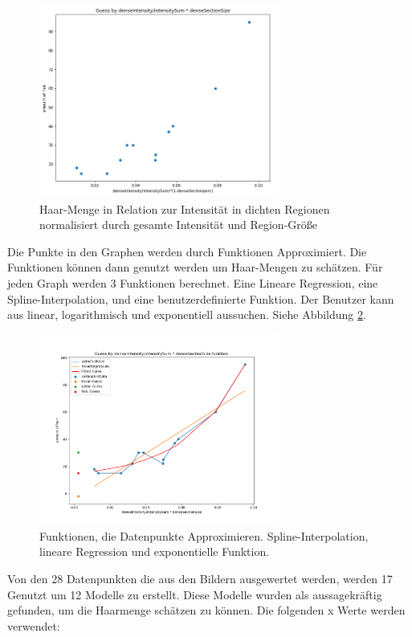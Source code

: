 \documentclass[german,a4paper, 12pt]{scrartcl}
\begin{document}
\begin{figure}
	\centering
	\includegraphics[width=0.7\textwidth]{fig64/gh4.PNG}
	\caption[]{Haar-Menge in Relation zur Intensität in dichten Regionen normalisiert durch gesamte Intensität und Region-Größe}
	\label{fig:mapping}
\end{figure}

Die Punkte in den Graphen werden durch Funktionen Approximiert. Die Funktionen können dann genutzt werden um Haar-Mengen zu schätzen.
Für jeden Graph werden 3 Funktionen berechnet. Eine Lineare Regression, eine Spline-Interpolation, und eine benutzerdefinierte Funktion.
Der Benutzer kann aus linear, logarithmisch und exponentiell aussuchen.
Siehe Abbildung \ref{fig:func}.

\begin{figure}
	\centering
	\includegraphics[width=0.7\textwidth]{fig64/g11_denseIntensitynorm.png}
	\caption[]{Funktionen, die Datenpunkte Approximieren. Spline-Interpolation, lineare Regression und exponentielle Funktion.}
	\label{fig:func}
\end{figure} 

Von den 28 Datenpunkten die aus den Bildern ausgewertet werden, werden 17 Genutzt um 12 Modelle zu erstellt. Diese Modelle wurden als aussagekräftig gefunden, um die Haarmenge schätzen zu können. Die folgenden x Werte werden verwendet:
\end{document}
